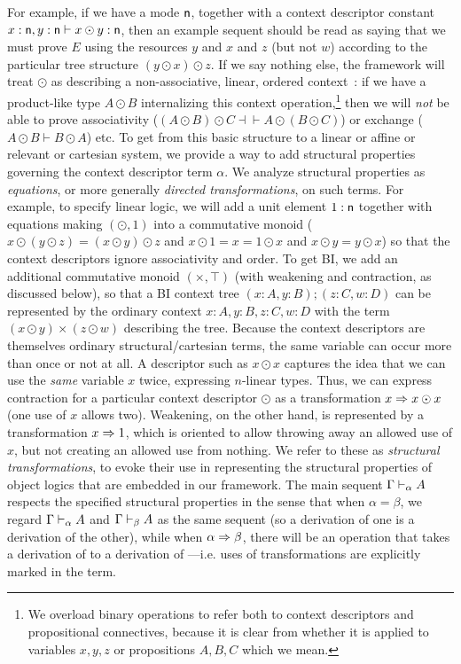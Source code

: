 For example, if we have a mode $\mathsf{n}$, together with a context
descriptor constant $x : \mathsf{n}, y:\mathsf{n} \vdash x \odot y : \mathsf{n}$,
then an example sequent 
should be read as saying that we must prove $E$ using the resources $y$
and $x$ and $z$ (but not $w$) according to the particular tree structure
${(y \odot x) \odot z}$.  If we say nothing else, the framework will
treat $\odot$ as describing a non-associative, linear, ordered
context~\citep{lambek58calculus}: if we have a product-like type $A
\odot B$ internalizing this context operation,\footnote{We overload
  binary operations to refer both to context descriptors and
  propositional connectives, because it is clear from whether it is
  applied to variables $x,y,z$ or propositions $A,B,C$ which we mean.}
then we will \emph{not} be able to prove associativity ($(A \odot B)
\odot C \dashv\vdash A \odot (B \odot C)$) or exchange ($A \odot B
\vdash B \odot A$) etc.  
To get from this basic structure to a linear or affine or relevant or
cartesian system, we provide a way to add structural properties governing
the context descriptor term $\alpha$.  We analyze structural properties
as \emph{equations}, or more generally \emph{directed transformations},
on such terms.  For example, to specify linear logic, we will add a unit
element $1 : \mathsf{n}$ together with equations making $(\odot,1)$ into a
commutative monoid ($x \odot (y \odot z) = (x \odot y) \odot z$ and 
$x \odot 1 = x = 1 \odot x$ and 
$x \odot y = y \odot x$)
so that the context descriptors ignore associativity and order.  To get
BI, we add an additional commutative monoid $(\times,\top)$ (with
weakening and contraction, as discussed below), so that a BI context
tree $(x:A,y:B);(z:C,w:D)$ can be represented by the ordinary context
$x:A,y:B,z:C,w:D$ with the term $(x \odot y) \times (z \odot w)$
describing the tree.  Because the context descriptors are themselves
ordinary structural/cartesian terms, the same variable can occur more
than once or not at all.  A descriptor such as $x \odot x$ captures the
idea that we can use the \emph{same} variable $x$ twice, expressing
$n$-linear types.  Thus, we can express contraction for a particular
context descriptor $\odot$ as a transformation $x \Rightarrow x \odot x$ (one
use of $x$ allows two).  Weakening, on the other hand, is represented by
a transformation $x \Rightarrow 1$, which is oriented to allow throwing away an
allowed use of $x$, but not creating an allowed use from nothing.  We
refer to these as \emph{structural transformations}, to evoke their use
in representing the structural properties of object logics that are
embedded in our framework.  The main sequent $\Gamma \vdash_{\alpha} A$
respects the specified structural properties in the sense that when
$\alpha = \beta$, we regard $\Gamma \vdash_{\alpha} A$ and
$\Gamma \vdash_{\beta} A$ as the same sequent (so a derivation of one is
a derivation of the other), while when $\alpha \Rightarrow
\beta$, there will be an operation that takes a derivation of
 to a derivation of
---i.e. uses of transformations are explicitly
marked in the term.  


